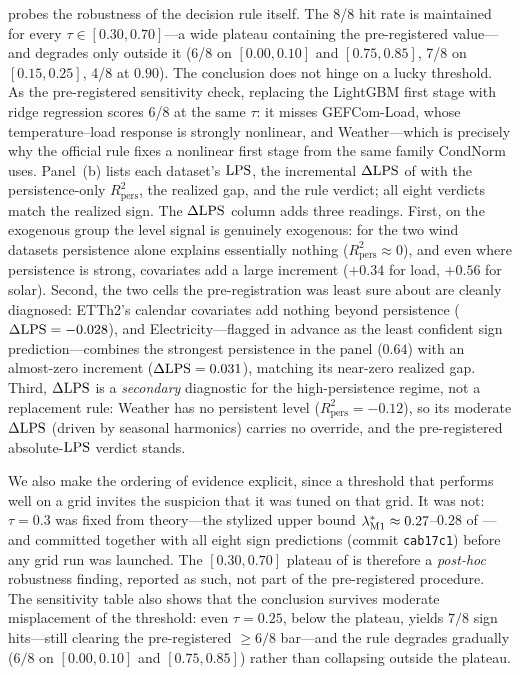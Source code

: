  probes the robustness of the decision rule itself. The 8/8 hit rate is maintained for every $\tau\in[0.30,0.70]$---a wide plateau containing the pre-registered value---and degrades only outside it (6/8 on $[0.00,0.10]$ and $[0.75,0.85]$, 7/8 on $[0.15,0.25]$, 4/8 at $0.90$). The conclusion does not hinge on a lucky threshold. As the pre-registered sensitivity check, replacing the LightGBM first stage with ridge regression scores 6/8 at the same $\tau$: it misses GEFCom-Load, whose temperature--load response is strongly nonlinear, and Weather---which is precisely why the official rule fixes a nonlinear first stage from the same family CondNorm uses. Panel~(b) lists each dataset's $\mathrm{LPS}$, the incremental $\Delta\mathrm{LPS}$ of  with the persistence-only $R^2_{\mathrm{pers}}$, the realized gap, and the rule verdict; all eight verdicts match the realized sign. The $\Delta\mathrm{LPS}$ column adds three readings. First, on the exogenous group the level signal is genuinely exogenous: for the two wind datasets persistence alone explains essentially nothing ($R^2_{\mathrm{pers}}\approx 0$), and even where persistence is strong, covariates add a large increment ($+0.34$ for load, $+0.56$ for solar). Second, the two cells the pre-registration was least sure about are cleanly diagnosed: ETTh2's calendar covariates add nothing beyond persistence ($\Delta\mathrm{LPS}=-0.028$), and Electricity---flagged in advance as the least confident sign prediction---combines the strongest persistence in the panel ($0.64$) with an almost-zero increment ($\Delta\mathrm{LPS}=0.031$), matching its near-zero realized gap. Third, $\Delta\mathrm{LPS}$ is a \emph{secondary} diagnostic for the high-persistence regime, not a replacement rule: Weather has no persistent level ($R^2_{\mathrm{pers}}=-0.12$), so its moderate $\Delta\mathrm{LPS}$ (driven by seasonal harmonics) carries no override, and the pre-registered absolute-$\mathrm{LPS}$ verdict stands.

We also make the ordering of evidence explicit, since a threshold that
performs well on a grid invites the suspicion that it was tuned on that
grid. It was not: $\tau = 0.3$ was fixed from theory---the stylized upper
bound $\lambda^{*}_{\mathrm{M1}} \approx 0.27$--$0.28$ of
---and committed together with all eight sign predictions
(commit \texttt{cab17c1}) before any grid run was launched. The
$[0.30, 0.70]$ plateau of  is therefore a \emph{post-hoc}
robustness finding, reported as such, not part of the pre-registered
procedure. The sensitivity table also shows that the conclusion survives
moderate misplacement of the threshold: even $\tau = 0.25$, below the
plateau, yields $7/8$ sign hits---still clearing the pre-registered
$\ge 6/8$ bar---and the rule degrades gradually ($6/8$ on $[0.00,0.10]$
and $[0.75,0.85]$) rather than collapsing outside the plateau.

